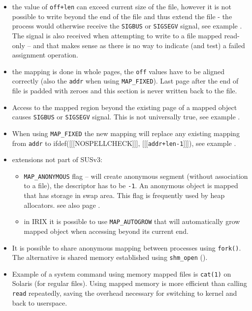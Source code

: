 \begin{itemize}
until the process writes to the page. At this moment a copy of the page is
created and subsequent changes by other processes are not visible anymore.
On FreeBSD such changes are never visible.  The spec says:
\emph{,,It is unspecified whether modifications to the underlying object done
after the \texttt{MAP\_PRIVATE} mapping is established are visible through the
\texttt{MAP\_PRIVATE} mapping.''}
\item the value of \texttt{off+l{}en} can exceed current size of the file,
however it is not possible to write beyond the end of the file and thus
extend the file - the process would otherwise receive the \texttt{SIGBUS} or
\texttt{SIGSEGV} signal, see example .
The signal is also received when attempting to write to a file mapped read-only
-- and that makes sense as there is no way to indicate (and test) a failed
assignment operation.
\item the mapping is done in whole pages, the \texttt{off} values have to
be aligned correctly (also the \texttt{addr} when using \texttt{MAP\_FIXED}).
Last page after the end of file is padded with zeroes and this section is
never written back to the file.
\item Access to the mapped region beyond the existing page of a mapped object
causes \texttt{SIGBUS} or \texttt{SIGSEGV} signal.
This is not universally true, see example .
\item When using \texttt{MAP\_FIXED} the new mapping will replace any existing
mapping from \texttt{addr} to
ifdef([[[NOSPELLCHECK]]], [[[\texttt{addr+l{}en-1}]]]), see example
.
\item extensions not part of SUSv3:
    \begin{itemize}
    \setlength{\itemsep}{0.8\itemsep}
    \item \texttt{MAP\_ANONYMOUS} flag -- will create anonymous segment
    (without association to a file), the descriptor has to be \texttt{-1}.
    An anonymous object is mapped that has storage in swap area.
    This flag is frequently used by heap allocators.
    see also page \pageref{SOLARIS_PROC_ADDR_SPACE}.
    \item in IRIX it is possible to use \texttt{MAP\_AUTOGROW} that will
    automatically grow mapped object when accessing beyond its current end.
    \end{itemize}
\item It is possible to share anonymous mapping between processes using
\texttt{fork()}. The alternative is shared memory established using
\texttt{shm\_open} (\pageref{POSIX_IPC}).
\item Example of a system command using memory mapped files is \texttt{cat(1)}
on Solaris (for regular files). Using mapped memory is more efficient than
calling \texttt{read} repeatedly, saving the overhead necessary for switching to
kernel and back to userspace.
\end{itemize}


